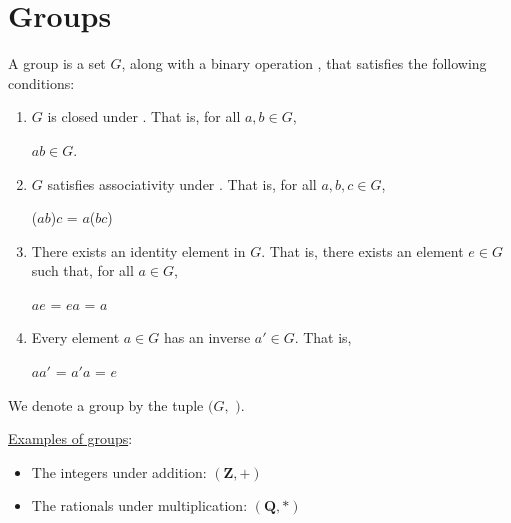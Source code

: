 \section{Groups}

\begin{definition}
A group is a set $G$, along with a binary operation , that satisfies the following conditions:

\begin{enumerate}

  \item $G$ is closed under ️. That is, for all $a, b \in G$, 
  
  $a$$b \in G$.
  \item $G$ satisfies associativity under . That is, for all $a, b, c \in G$,
    
  ($a$$b$)$c$ = $a$($b$$c$) 
  
  \item There exists an identity element in $G$. That is, there exists an element $e \in G$ such that, for all $a \in G$, 
  
  $a$$e$ = $e$$a$ = $a$
  
  \item Every element $a\in G$ has an inverse $a' \in G$. That is,
  
  $a$$a'$ = $a'$$a$ = $e$
  
\end{enumerate}

\end{definition}

We denote a group by the tuple $(G,$ $)$.

\begin{center}
    \underline{Examples of groups}:
\end{center}

\begin{itemize}
    \item The integers under addition: $(\mathbf{Z}, +)$
    \item The rationals under multiplication: $(\mathbf{Q}, *)$
\end{itemize}

